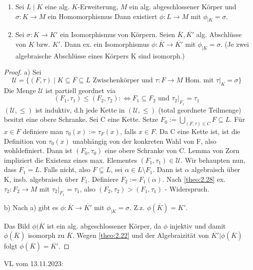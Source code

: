 \documentclass[../main.tex]{subfiles}
\begin{document}
\begin{theorem}[Fortsetzungssatz]
    \begin{enumerate}[label=(\alph*)]
        \item Sei $L \mid K$ eine alg. $K$-Erweiterung, $M$ ein alg. abgeschlossener Körper und $\sigma: K \rightarrow M$ ein Homomorphismus Dann existiert $\phi: L \rightarrow M$ mit $\phi_{|K} = \sigma$.
        \item Sei $\sigma: K \rightarrow K'$ ein Isomorphismus von Körpern. Seien $\overline{K}, \overline{K'}$ alg. Abschlüsse von $K$ bzw. $K'$. Dann ex. ein Isomorphismus $\phi: \overline{K} \rightarrow \overline{K'}$ mit $\phi_{|K} = \sigma$. (Je zwei algebraische Abschlüsse eines Körpers K sind isomorph.)
    \end{enumerate}
\end{theorem}
\begin{proof}
    a) Sei $$\mathcal{U} = \{(F,\tau) \mid K \subseteq F \subseteq L \text{ Zwischenkörper und } \tau: F \rightarrow M \text{ Hom. mit } \tau|_K = \sigma\}$$ Die Menge $\mathcal{U}$ ist partiell geordnet via 
    $$(F_1, \tau_1) \leq (F_2, \tau_2) :\Leftrightarrow F_1 \subseteq F_2 \text{ und } \tau_2|_{F_1} = \tau_1$$
    $(\mathcal{U},\leq)$ ist induktiv, d.h jede Kette in $(\mathcal{U},\leq)$ (total geordnete Teilmenge) besitzt eine obere Schranke. Sei C eine Kette. Setze $F_0 := \bigcup_{(F,\tau) \in C} F \subseteq L$. Für $x \in F$ definiere man $\tau_0(x) := \tau_F(x)$, falls $x \in F$. Da C eine Kette ist, ist die Definition von $\tau_0(x)$ unabhängig von der konkreten Wahl von F, also wohldefiniert. Dann ist $(F_0,\tau_0)$ eine obere Schranke von C. Lemma von Zorn impliziert die Existenz eines max. Elementes $(F_1, \tau_1) \in \mathcal{U}$. Wir behaupten nun, dass $F_1 = L$. Falls nicht, also $F \subsetneq L$, sei $\alpha \in L\setminus F_1$. Dann ist $\alpha$ algebraisch über K, insb. algebraisch über $F_1$. Definiere $F_2 := F_1(\alpha)$. Nach \ref{theo:2.28} ex. $\tau_2: F_2 \rightarrow M$ mit $\tau_2|_{F_1} = \tau_1$, also $(F_2, \tau_2) > (F_1, \tau_1)$ - Widerspruch.

    b)
    Nach a) gibt es $\phi: \overline{K} \rightarrow \overline{K'}$ mit $\phi_{|K} = \sigma$. Z.z. $\phi(\overline{K}) = K'$.

    Das Bild $\phi(\overline{K}$ ist ein alg. abgeschlossener Körper, da $\phi$ injektiv und damit $\phi(\overline{K})$ isomorph zu $\overline{K}$.
    \TODO[Abbildung]
    Wegen \cref{theo:2.22} und der Algebraizität von $\overline{K'}|\phi(\overline{K})$ folgt $\phi(\overline{K}) = \overline{K'}$.
\end{proof}
\begin{flushright}
VL vom 13.11.2023:
\end{flushright}
\end{document}

